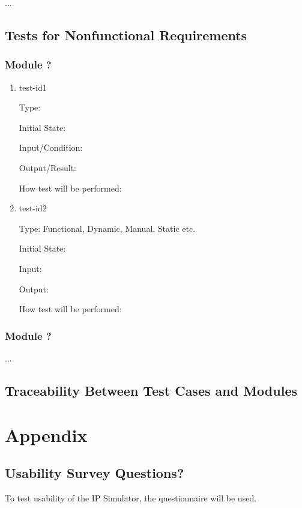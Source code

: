 \documentclass[12pt, titlepage]{article}
\begin{document}
...

\subsection{Tests for Nonfunctional Requirements}

\subsubsection{Module ?}
		
\begin{enumerate}

\item{test-id1\\}

Type: 
					
Initial State: 
					
Input/Condition: 
					
Output/Result: 
					
How test will be performed: 
					
\item{test-id2\\}

Type: Functional, Dynamic, Manual, Static etc.
					
Initial State: 
					
Input: 
					
Output: 
					
How test will be performed: 

\end{enumerate}

\subsubsection{Module ?}

...

\subsection{Traceability Between Test Cases and Modules}

				




\newpage

\section{Appendix\label{appendix}}

\subsection{Usability Survey Questions?}
To test usability of the IP Simulator, the questionnaire \cite{hinderks_schrepp_thomaschewski} will be used.
\newpage{}
\end{document}
